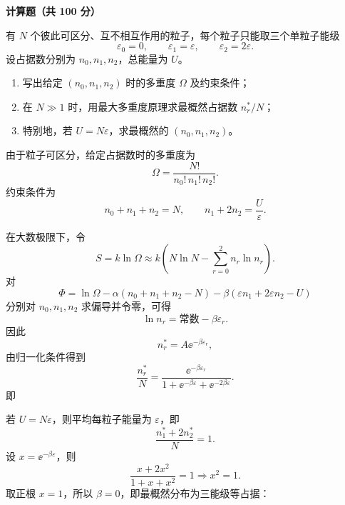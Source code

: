 ﻿


\textbf{计算题（共 100 分）}

\begin{question}[16分]
有 $N$ 个彼此可区分、互不相互作用的粒子，每个粒子只能取三个单粒子能级
\[
\varepsilon_0=0,\qquad \varepsilon_1=\varepsilon,\qquad \varepsilon_2=2\varepsilon.
\]
设占据数分别为 $n_0,n_1,n_2$，总能量为 $U$。
\begin{enumerate}[label=(\arabic*),leftmargin=2.8em,itemsep=0.2em]
\item 写出给定 $(n_0,n_1,n_2)$ 时的多重度 $\Omega$ 及约束条件；
\item 在 $N\gg1$ 时，用最大多重度原理求最概然占据数 $n_r^\ast/N$；
\item 特别地，若 $U=N\varepsilon$，求最概然的 $(n_0,n_1,n_2)$。
\end{enumerate}
\begin{solution}

由于粒子可区分，给定占据数时的多重度为
\[
\Omega=\frac{N!}{n_0!\,n_1!\,n_2!}.
\]
约束条件为
\[
n_0+n_1+n_2=N,\qquad
n_1+2n_2=\frac{U}{\varepsilon}.
\]

在大数极限下，令
\[
S=k\ln\Omega
\approx k\left(N\ln N-\sum_{r=0}^2 n_r\ln n_r\right).
\]
对
\[
\Phi=\ln\Omega-\alpha(n_0+n_1+n_2-N)-\beta(\varepsilon n_1+2\varepsilon n_2-U)
\]
分别对 $n_0,n_1,n_2$ 求偏导并令零，可得
\[
\ln n_r = \text{常数}-\beta \varepsilon_r.
\]
因此
\[
n_r^\ast = A \ee^{-\beta\varepsilon_r},
\]
由归一化条件得到
\[
\frac{n_r^\ast}{N}=
\frac{\ee^{-\beta\varepsilon_r}}{1+\ee^{-\beta\varepsilon}+\ee^{-2\beta\varepsilon}}.
\]
即

若 $U=N\varepsilon$，则平均每粒子能量为 $\varepsilon$，即
\[
\frac{n_1^\ast+2n_2^\ast}{N}=1.
\]
设 $x=\ee^{-\beta\varepsilon}$，则
\[
\frac{x+2x^2}{1+x+x^2}=1
\Longrightarrow x^2=1.
\]
取正根 $x=1$，所以 $\beta=0$，即最概然分布为三能级等占据：
\end{solution}
\end{question}

